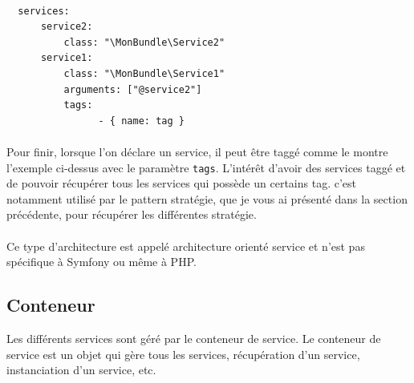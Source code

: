 \begin{verbatim}

  services:
      service2:
          class: "\MonBundle\Service2"
      service1:
          class: "\MonBundle\Service1"
          arguments: ["@service2"]
          tags:
                - { name: tag }

\end{verbatim}
\paragraph{}
Pour finir, lorsque l'on déclare un service, il peut être taggé comme le montre l'exemple ci-dessus avec le paramètre \verb?tags?.
L'intérêt d'avoir des services taggé et de pouvoir récupérer tous les services qui possède un certains tag. c'est notamment utilisé par le pattern stratégie, que je vous ai présenté dans la section précédente, pour récupérer les différentes stratégie.
\paragraph{}
Ce type d'architecture est appelé \og architecture orienté service \fg{} et n'est pas spécifique à Symfony ou même à PHP.
\subsection{Conteneur}
Les différents services sont géré par le conteneur de service. Le conteneur de service est un objet qui gère tous les services, récupération d'un service, instanciation d'un service, etc.
